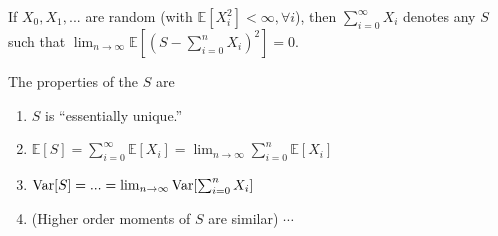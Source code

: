 \documentclass[11pt]{elegantbook}
\begin{document}
\begin{definition}
    If $X_0,X_1,...$ are random (with $\mathbb{E}[X_i^2]<\infty,\forall i$), then $\sum_{i=0}^\infty X_i$ denotes any $S$ such that $\lim_{n \rightarrow \infty}\mathbb{E}[(S-\sum_{i=0}^n X_i)^2]=0$.
\end{definition}
\begin{lemma}
    The properties of the $S$ are
    \begin{enumerate}
        \item $S$ is ``essentially unique.''
        \item $\mathbb{E}[S]=\sum_{i=0}^\infty \mathbb{E}[X_i]=\lim_{n \rightarrow \infty}\sum_{i=0}^n \mathbb{E}[X_i]$
        \item $\textnormal{Var}[S]=...=\lim_{n \rightarrow \infty}\textnormal{Var}[\sum_{i=0}^n X_i]$
        \item (Higher order moments of $S$ are similar) $\cdots$
    \end{enumerate}
\end{lemma}
\end{document}
